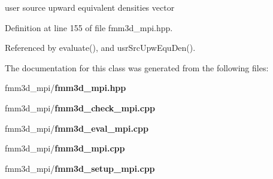 user source upward equivalent densities vector 

Definition at line 155 of file fmm3d\_\-mpi.hpp.

Referenced by evaluate(), and usr\-Src\-Upw\-Equ\-Den().

The documentation for this class was generated from the following files:\begin{CompactItemize}
\item 
fmm3d\_\-mpi/{\bf fmm3d\_\-mpi.hpp}\item 
fmm3d\_\-mpi/{\bf fmm3d\_\-check\_\-mpi.cpp}\item 
fmm3d\_\-mpi/{\bf fmm3d\_\-eval\_\-mpi.cpp}\item 
fmm3d\_\-mpi/{\bf fmm3d\_\-mpi.cpp}\item 
fmm3d\_\-mpi/{\bf fmm3d\_\-setup\_\-mpi.cpp}\end{CompactItemize}
